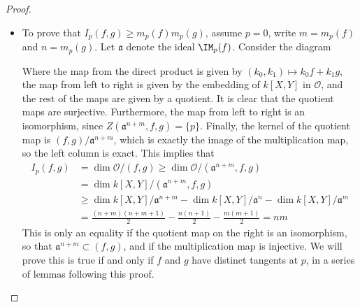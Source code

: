 \begin{proof}
\begin{itemize}
        \item To prove that $I_p(f,g) \geq m_p(f) m_p(g)$, assume $p = 0$, write $m = m_p(f)$ and $n = m_p(g)$. Let $\mathfrak{a}$ denote the ideal $\IM_p(f)$. Consider the diagram
    \begin{center}
    \end{center}
    Where the map from the direct product is given by $(k_0,k_1) \mapsto k_0f + k_1g$, the map from left to right is given by the embedding of $k[X,Y]$ in $\mathcal{O}$, and the rest of the maps are given by a quotient. It is clear that the quotient maps are surjective. Furthermore, the map from left to right is an isomorphism, since $Z(\mathfrak{a}^{n+m},f,g) = \{ p \}$. Finally, the kernel of the quotient map is $(f,g)/\mathfrak{a}^{n+m}$, which is exactly the image of the multiplication map, so the left column is exact. This implies that
    \begin{align*}
        I_p(f,g) &= \dim \mathcal{O}/(f,g) \geq \dim \mathcal{O}/(\mathfrak{a}^{n+m},f,g)\\
        &= \dim k[X,Y]/(\mathfrak{a}^{n+m},f,g)\\
        &\geq \dim k[X,Y]/\mathfrak{a}^{n+m} - \dim k[X,Y]/\mathfrak{a}^n - \dim k[X,Y]/\mathfrak{a}^m\\
        &= \frac{(n+m)(n+m+1)}{2} - \frac{n(n+1)}{2} - \frac{m(m+1)}{2} = nm
    \end{align*}
    This is only an equality if the quotient map on the right is an isomorphism, so that $\mathfrak{a}^{n+m} \subset (f,g)$, and if the multiplication map is injective. We will prove this is true if and only if $f$ and $g$ have distinct tangents at $p$, in a series of lemmas following this proof.
    \end{itemize}
\end{proof}

